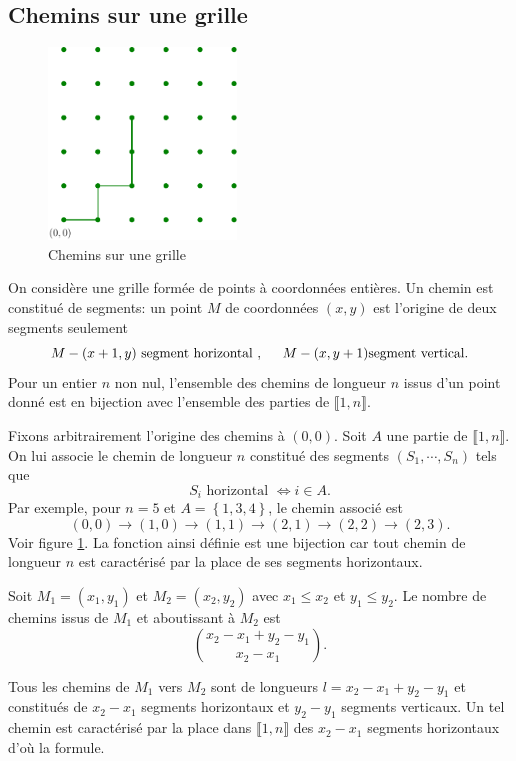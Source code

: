 \subsection{Chemins sur une grille}
\begin{figure}[h!]
  \centering
  \includegraphics[width=5cm]{C2007_1.pdf}
  \caption{Chemins sur une grille}
  \label{fig:C2007_1}
\end{figure}

On considère une grille formée de points à coordonnées entières. Un chemin est constitué de segments: un point $M$ de coordonnées $(x,y)$ est l'origine de deux segments seulement
\[
 M-(x+1,y) \text{ segment horizontal }, \hspace{0.5cm} M-(x,y+1) \text{segment vertical}. 
\]
Pour un entier $n$ non nul, l'ensemble des chemins de longueur $n$ issus d'un point donné est en bijection avec l'ensemble des parties de $\llbracket 1,n\rrbracket$.
\begin{demo}
 Fixons arbitrairement l'origine des chemins à $(0,0)$. Soit $A$ une partie de $\llbracket 1,n \rrbracket$. On lui associe le chemin de longueur $n$ constitué des segments $(S_1,\cdots, S_n)$ tels que 
 \[
  S_i \text{ horizontal } \Leftrightarrow i \in A. 
 \]
Par exemple, pour $n=5$ et $A = \left\lbrace 1,3,4 \right\rbrace$, le chemin associé est
\[
 (0,0) \rightarrow (1,0)\rightarrow (1,1) \rightarrow (2,1) \rightarrow (2,2) \rightarrow (2,3).
\]
Voir figure \ref{fig:C2007_1}. La fonction ainsi définie est une bijection car tout chemin de longueur $n$ est caractérisé par la place de ses segments horizontaux.
\end{demo}
Soit $M_1 = (x_1,y_1)$ et $M_2 = (x_2,y_2)$ avec $x_1 \leq x_2$ et $y_1 \leq y_2$. Le nombre de chemins issus de $M_1$ et aboutissant à $M_2$ est 
\[
\binom{x_2 - x_1 + y_2 - y_1}{x_2 - x_1}. 
\]
\begin{demo}
 Tous les chemins de $M_1$ vers $M_2$ sont de longueurs $l = x_2 - x_1 + y_2 - y_1$ et constitués de $x_2 - x_1$ segments horizontaux et $y_2 - y_1$ segments verticaux. Un tel chemin est caractérisé par la place dans $\llbracket 1,n \rrbracket$ des $x_2-x_1$ segments horizontaux d'où la formule.
\end{demo}
\clearpage
